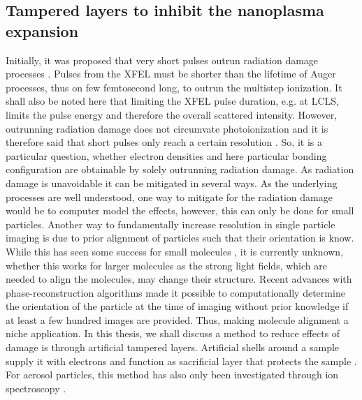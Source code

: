 \subsection{Tampered layers to inhibit the nanoplasma expansion}
%
%
Initially, it was proposed that very short pulses outrun radiation damage processes \citep{Neutze-2000-Nature}. Pulses from the XFEL must be shorter than the lifetime of Auger processes, thus on few femtosecond long, to outrun the multistep ionization. It shall also be noted here that limiting the XFEL pulse duration, e.g. at LCLS, limits the pulse energy and therefore the overall scattered intensity. However, outrunning radiation damage does not circumvate photoionization and it is therefore said that short pulses only reach a certain resolution \citep{Aquila-2015-StrucDyn}. So, it is a particular question, whether electron densities and here particular bonding configuration are obtainable by solely outrunning radiation damage. As radiation damage is unavoidable it can be mitigated in several ways. As the underlying processes are well understood, one way to mitigate for the radiation damage would be to computer model the effects, however, this can only be done for small particles. Another way to fundamentally increase resolution in single particle imaging is due to prior alignment of particles such that their orientation is know. While this has seen some success for small molecules \citep{Kupper-2014-PRL}, it is currently unknown, whether this works for larger molecules as the strong light fields, which are needed to align the molecules, may change their structure. Recent advances with phase-reconstruction algorithms made it possible to computationally determine the orientation of the particle at the time of imaging \citep{Loh-2009-PRE,Ekeberg-2015-PRL} without prior knowledge if at least a few hundred images are provided. Thus, making molecule alignment a niche application. In this thesis, we shall discuss a method to reduce effects of damage is through artificial tampered layers. Artificial shells around a sample supply it with electrons and function as sacrificial layer that protects the sample \citep{Hau-Riege-2010-PRL}. For aerosol particles, this method has also only been investigated through ion spectroscopy \citep{Hoener-2008-JPB,Ziemkewitz-2017-unpublished}.

